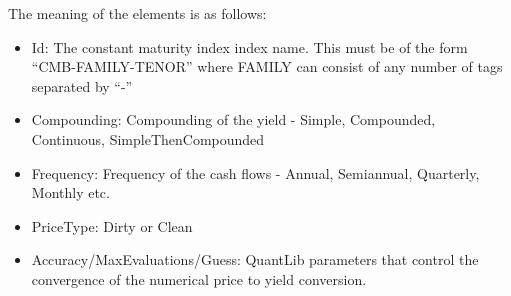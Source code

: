 The meaning of the elements is as follows:

\begin{itemize}
\item Id: The constant maturity index index name. This must be of the form ``CMB-FAMILY-TENOR'' where FAMILY can consist of any number of tags separated by ``-''
\item Compounding: Compounding of the yield - Simple, Compounded, Continuous, SimpleThenCompounded
\item Frequency: Frequency of the cash flows - Annual, Semiannual, Quarterly, Monthly etc.
\item PriceType: Dirty or Clean
\item Accuracy/MaxEvaluations/Guess: QuantLib parameters that control the convergence of the numerical price to yield conversion. 
\end{itemize}


